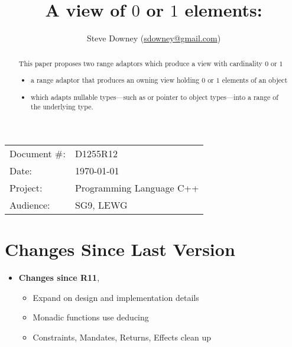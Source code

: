 \documentclass[a4paper,10pt,oneside,openany,final,article]{memoir}
\begin{document}
\title{A view of $0$ or $1$ elements: }
\author{
Steve Downey \small(\href{mailto:sdowney@gmail.com}{sdowney@gmail.com}) \\
}
\date{} %
\maketitle

\begin{flushright}
\begin{tabular}{ll}
  Document \#: & D1255R12 \\
  Date: & \today \\
  Project: & Programming Language C++ \\
  Audience: & SG9, LEWG
\end{tabular}
\end{flushright}

\begin{abstract}
  This paper proposes two range adaptors which produce a view with cardinality $0$ or $1$
  \begin{itemize}
  \item
     a range adaptor that produces an owning view holding $0$ or $1$ elements of an object
  \item
     which adapts nullable types---such as  or pointer to object types---into a range of the underlying type.
  \end{itemize}
\end{abstract}

\tableofcontents*

\chapter*{Changes Since Last Version}

\begin{itemize}
\item \textbf{Changes since R11},
  \begin{itemize}
  \item Expand on design and implementation details
  \item Monadic functions use deducing 
  \item Constraints, Mandates, Returns, Effects clean up
  \end{itemize}
\end{itemize}
\end{document}
